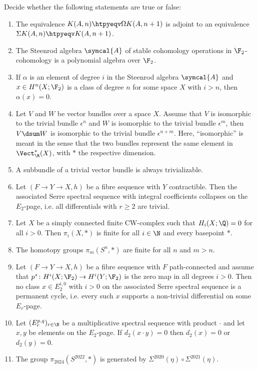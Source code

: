 \begin{questions*}
	Decide whether the following statements are true or false:
	\begin{enumerate}
		\item The equivalence $K(A, n) \htpyeqv \Omega K(A, n + 1)$ is adjoint to an equivalence $\Sigma K(A, n) \htpyeqv K(A, n + 1)$.
		\item The Steenrod algebra $\symcal{A}$ of stable cohomology operations in $\F_2$-cohomology is a polynomial algebra over $\F_2$.
		\item If $\alpha$ is an element of degree $i$ in the Steenrod algebra $\symcal{A}$ and $x \in H^n(X; \F_2)$ is a class of degree $n$ for some space $X$ with $i > n$, then $\alpha(x) = 0$.
		\item Let $V$ and $W$ be vector bundles over a space $X$.
			Assume that $V$ is isomorphic to the trivial bundle $\epsilon^n$ and $W$ is isomorphic to the trivial bundle $\epsilon^m$, then $V \dsum W$ is isomorphic to the trivial bundle $\epsilon^{n + m}$.
			Here, \enquote{isomorphic} is meant in the sense that the two bundles represent the same element in $\Vect_\R^*(X)$, with $*$ the respective dimension.
		\item A subbundle of a trivial vector bundle is always trivializable.
		\item Let $(F \to Y \to X, h)$ be a fibre sequence with $Y$ contractible.
			Then the associated Serre spectral sequence with integral coefficients collapses on the $E_2$-page, i.e. all differentials with $r \geq 2$ are trivial.
		\item Let $X$ be a simply connected finite CW-complex such that $H_i(X; \Q) = 0$ for all $i > 0$.
			Then $\pi_i(X, *)$ is finite for all $i \in \N$ and every basepoint $*$.
		\item The homotopy groups $\pi_m(S^n, *)$ are finite for all $n$ and $m > n$.
		\item Let $(F \to Y \to X, h)$ be a fibre sequence with $F$ path-connected and assume that $p^*\colon H^i(X; \F_2) \to H^i(Y; \F_2)$ is the zero map in all degrees $i > 0$.
			Then no class $x \in E_2^{i, 0}$ with $i > 0$ on the associated Serre spectral sequence is a permanent cycle, i.e. every such $x$ supports a non-trivial differential on some $E_r$-page.
		\item Let $(E_r^{p, q})_{r \in \N}$ be a multiplicative spectral sequence with product $\cdot$ and let $x, y$ be elements on the $E_2$-page.
			If $d_2(x \cdot y) = 0$ then $d_2(x) = 0$ or $d_2(y) = 0$.
		\item The group $\pi_{2024}(S^{2022}, *)$ is generated by $\Sigma^{2020}(\eta) \circ \Sigma^{2021}(\eta)$.

\end{enumerate}
\end{questions*}
